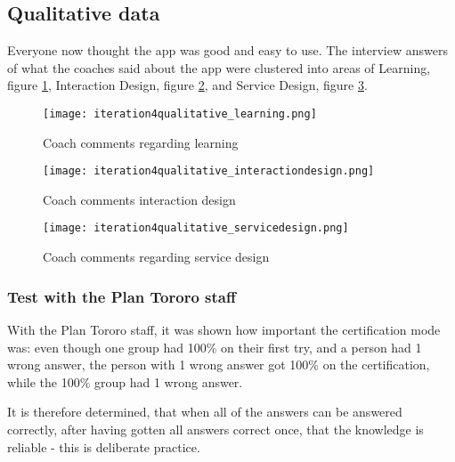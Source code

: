 \subsection{Qualitative data}

Everyone now thought the app was good and easy to use. The interview answers of what the coaches said about the app were clustered into areas of Learning, figure \ref{fig:learning}, Interaction Design, figure \ref{fig:interactiondesign}, and Service Design, figure \ref{fig:servicedesign}.

\begin{figure}[h]
    \centering
    \texttt{[image: iteration4qualitative\_learning.png]}
    \caption{Coach comments regarding learning}
    \label{fig:learning}
\end{figure}

\begin{figure}[h]
    \centering
    \texttt{[image: iteration4qualitative\_interactiondesign.png]}
    \caption{Coach comments interaction design}
    \label{fig:interactiondesign}
\end{figure}

\begin{figure}[h]
    \centering
    \texttt{[image: iteration4qualitative\_servicedesign.png]}
    \caption{Coach comments regarding service design}
    \label{fig:servicedesign}
\end{figure}

\subsubsection{Test with the Plan Tororo staff}

With the Plan Tororo staff, it was shown how important the certification mode was: even though one group had 100\% on their first try, and a person had 1 wrong answer, the person with 1 wrong answer got 100\% on the certification, while the 100\% group had 1 wrong answer.

It is therefore determined, that when all of the answers can be answered correctly, after having gotten all answers correct once, that the knowledge is reliable - this is deliberate practice.
